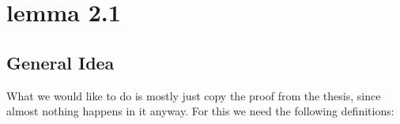 \chapter{lemma 2.1}\label{ch_lemma2_1}

\section{General Idea}
What we would like to do is mostly just copy the proof from the thesis, since almost
nothing happens in it anyway. For this we need the following definitions:
